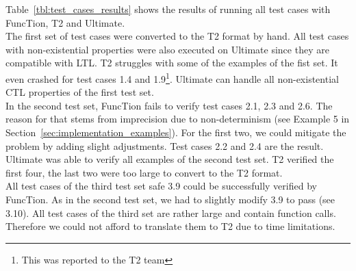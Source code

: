 \documentclass[11pt,a4paper,titlepage]{article}
\theoremstyle{definition}
\begin{document}
Table~\ref{tbl:test_cases_results} shows the results of running all test cases with FuncTion, T2 and Ultimate.\\

The first set of test cases were converted to the T2 format by hand. 
All test cases with non-existential properties were also executed on Ultimate since they are compatible with LTL.
T2 struggles with some of the examples of the fist set. It even crashed for test cases 1.4 and 1.9\footnote{This was reported to the T2 team}.  
Ultimate can handle all non-existential CTL properties of the first test set.\\

In the second test set, FuncTion fails to verify test cases 2.1, 2.3 and 2.6. The reason for that stems from imprecision due to non-determinism 
(see Example 5 in Section~\ref{sec:implementation_examples}). For the first two, we could mitigate the problem by adding slight adjustments. 
Test cases 2.2 and 2.4 are the result. Ultimate was able to verify all examples of the second test set. 
T2 verified the first four, the last two were too large to convert to the T2 format.\\

All test cases of the third test set safe 3.9 could be successfully verified by FuncTion. As in the second test set, we had to slightly modify
3.9 to pass (see 3.10). All test cases of the third set are rather large and contain function calls. Therefore we could not afford to translate them
to T2 due to time limitations.\\
\end{document}
